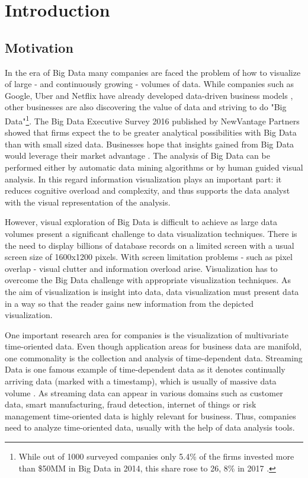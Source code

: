 \chapter{Introduction}
\label{chap:introduction}

\section{Motivation}
In the era of Big Data many companies are faced the problem of how to visualize of large - and continuously growing - volumes of data. While companies such as Google,  Uber and Netflix have already developed data-driven business models \cite{Ryan2016}, other businesses are also discovering the value of data and striving to do "Big Data"\footnote{While out of 1000 surveyed companies only 5.4\% of the firms invested more than \$50MM in Big Data in 2014,  this share rose to 26, 8\% in 2017  \cite{Bean2016}.}. The Big Data Executive Survey 2016 published by NewVantage Partners showed that firms expect the to be greater analytical possibilities with Big Data than with small sized data. Businesses hope that insights gained from Big Data would leverage their market advantage  \cite{Bean2016}. The analysis of Big Data can be performed either by automatic data mining algorithms or by human guided visual analysis. In this regard information visualization plays an important part: it reduces cognitive overload and complexity, and thus supports the data analyst with the visual representation of the analysis.
\par
 However,  visual exploration of Big Data is difficult to achieve as large data volumes present a significant challenge to data visualization techniques. There is the need to display billions of database records on a limited screen with a usual screen size of 1600x1200 pixels. With screen limitation problems - such as pixel overlap - visual clutter and information overload arise. Visualization has to overcome the Big Data challenge with appropriate visualization techniques. As the aim of visualization is insight into data,  data visualization must present data in a way so that the reader gains new information from the depicted visualization.
\par
One important research area for companies is the visualization of multivariate time-oriented data. Even though application areas for business data are manifold, one commonality is the collection and analysis of time-dependent data. Streaming Data is one famous example of time-dependent data as it denotes continually arriving data (marked with a timestamp), which is usually of massive data volume  \cite{Callaghan2002}. As streaming data can appear in various domains such as customer data,  smart manufacturing,  fraud detection,  internet of things or risk management time-oriented data is highly relevant for business. Thus,  companies need to analyze time-oriented data,  usually with the help of data analysis tools. 
